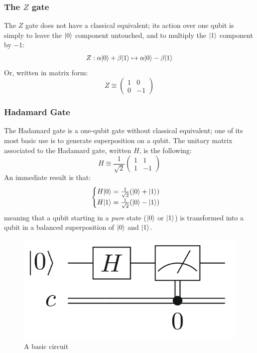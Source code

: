 \documentclass[12pt,a4paper]{article}
\theoremstyle{definition}
\DeclarePairedDelimiter\ket{\lvert}{\rangle}
\begin{document}
\subsubsection{The \texorpdfstring{$Z$}{Z} gate}
The $Z$ gate does not have a classical equivalent; its action over one qubit is simply to leave the $\ket{0}$ component untouched, and to multiply the $\ket{1}$ component by $-1$:
\begin{equation*}
    Z : \alpha\ket{0} + \beta\ket{1} \mapsto \alpha\ket{0} - \beta\ket{1}
\end{equation*}
Or, written in matrix form:
\begin{equation*}
    Z \cong \begin{pmatrix}
        1&0\\
        0&-1
    \end{pmatrix}
\end{equation*}

\subsubsection{Hadamard Gate}
The Hadamard gate is a one-qubit gate without classical equivalent; one of its most basic use is to generate superposition on a qubit. The unitary matrix associated to the Hadamard gate, written $H$, is the following:
\begin{equation*}
    H \cong \frac{1}{\sqrt{2}}
    \begin{pmatrix}
        1&1\\
        1&-1
    \end{pmatrix}
\end{equation*}
An immediate result is that:
\begin{equation*}
    \begin{cases}
        H\ket{0} = \frac{1}{\sqrt{2}}(\ket{0}+\ket{1}) \\
        H\ket{1} = \frac{1}{\sqrt{2}}(\ket{0}-\ket{1})
    \end{cases}
\end{equation*}
meaning that a qubit starting in a \emph{pure} state ($\ket{0}$ or $\ket{1}$) is transformed into a qubit in a balanced superposition of $\ket{0}$ and $\ket{1}$.

\begin{figure}
    \label{fig:basic-circuit}
    \centering
    \includegraphics*[scale=0.3]{basic-circuit.png}
    \caption{A basic circuit}
\end{figure}
\end{document}
